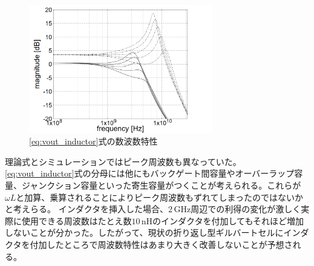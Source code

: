 \documentclass[twocolumn]{jsarticle}
\begin{document}
    \begin{figure}[H]
        \begin{center}
            \includegraphics*[width = 80mm]{figures/inductor_monochrome.PNG}
            \caption{\eqref{eq:vout_inductor}式の数波数特性}
            \label{fig:inductor}
        \end{center}
    \end{figure}
    理論式とシミュレーションではピーク周波数も異なっていた。\eqref{eq:vout_inductor}式の分母には他にもバックゲート間容量やオーバーラップ容量、ジャンクション容量といった寄生容量がつくことが考えられる。これらが$\omega L$と加算、乗算されることによりピーク周波数もずれてしまったのではないかと考えらる。
    インダクタを挿入した場合、$2\,\mathrm{GHz}$周辺での利得の変化が激しく実際に使用できる周波数はたとえ数$10\,\mathrm{nH}$のインダクタを付加してもそれほど増加しないことが分かった。したがって、現状の折り返し型ギルバートセルにインダクタを付加したところで周波数特性はあまり大きく改善しないことが予想される。
\end{document}
